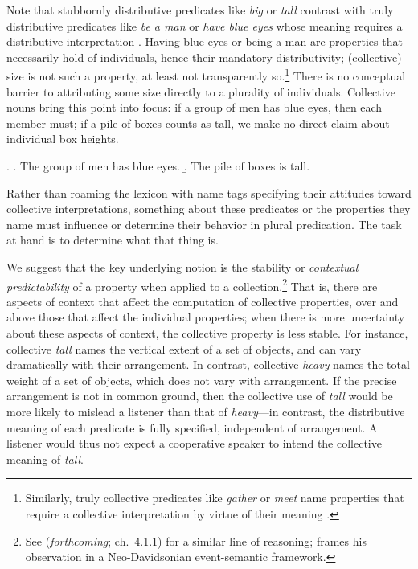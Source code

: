 \documentclass[preprint,12pt,authoryear,titlepage]{elsarticle}
\begin{document}
Note that stubbornly distributive predicates like \emph{big} or \emph{tall} contrast with truly distributive predicates like \emph{be a man} or \emph{have blue eyes} whose meaning requires a distributive interpretation \citep{link1983}. Having blue eyes or being a man are properties that necessarily hold of individuals, hence their mandatory distributivity; (collective) size is not such a property, at least not transparently so.\footnote{Similarly, truly collective predicates like \emph{gather} or \emph{meet} name properties that require a collective interpretation by virtue of their meaning \citep{schwarzschild1994}.} There is no conceptual barrier to attributing some size directly to a plurality of individuals. Collective nouns bring this point into focus: if a group of men has blue eyes, then each member must; if a pile of boxes counts as tall, we make no direct claim about individual box heights. 

\ex. \a. The group of men has blue eyes. 
	\b. The pile of boxes is tall.

Rather than roaming the lexicon with name tags specifying their attitudes toward collective interpretations, something about these predicates or the properties they name must influence or determine their behavior in plural predication. The task at hand is to determine what that thing is.

We suggest that the key underlying notion is the stability or \emph{contextual predictability} of a property when applied to a collection.\footnote{See \citeauthor{schein} (\emph{forthcoming}; ch.~4.1.1) for a similar line of reasoning; \citeauthor{schein} frames his observation in a Neo-Davidsonian event-semantic framework.}
That is, there are aspects of context that affect the computation of collective properties, over and above those that affect the individual properties; when there is more uncertainty about these aspects of context, the collective property is less stable.
For instance, collective \emph{tall} names the vertical extent of a set of objects, and can vary dramatically with their arrangement.
In contrast, collective \emph{heavy} names the total weight of a set of objects, which does not vary with arrangement. 
If the precise arrangement is not in common ground, then the collective use of \emph{tall} would be more likely to mislead a listener than that of \emph{heavy}---in contrast, the distributive meaning of each predicate is fully specified, independent of arrangement. A listener would thus not expect a cooperative speaker to intend the collective meaning of \emph{tall}.
\end{document}
